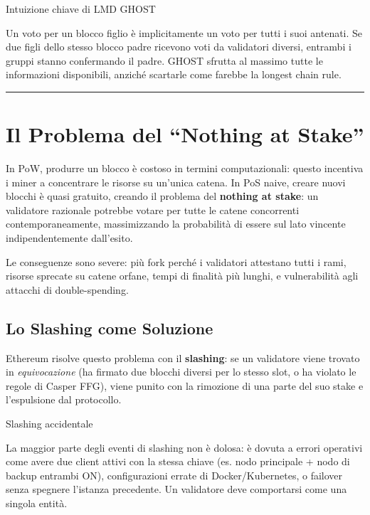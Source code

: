 \documentclass[
  italian,
  openany]{book}
\begin{document}
\begin{callouttip}{Intuizione chiave di LMD GHOST}

Un voto per un blocco figlio è implicitamente un voto per tutti i suoi
antenati. Se due figli dello stesso blocco padre ricevono voti da
validatori diversi, entrambi i gruppi stanno confermando il padre. GHOST
sfrutta al massimo tutte le informazioni disponibili, anziché scartarle
come farebbe la longest chain rule.

\end{callouttip}

\begin{center}\rule{0.5\linewidth}{0.5pt}\end{center}

\section{Il Problema del ``Nothing at
Stake''}\label{il-problema-del-nothing-at-stake}

In PoW, produrre un blocco è costoso in termini computazionali: questo
incentiva i miner a concentrare le risorse su un'unica catena. In PoS
naive, creare nuovi blocchi è quasi gratuito, creando il problema del
\textbf{nothing at stake}: un validatore razionale potrebbe votare per
tutte le catene concorrenti contemporaneamente, massimizzando la
probabilità di essere sul lato vincente indipendentemente dall'esito.

Le conseguenze sono severe: più fork perché i validatori attestano tutti
i rami, risorse sprecate su catene orfane, tempi di finalità più lunghi,
e vulnerabilità agli attacchi di double-spending.

\subsection{Lo Slashing come
Soluzione}\label{lo-slashing-come-soluzione}

Ethereum risolve questo problema con il \textbf{slashing}: se un
validatore viene trovato in \emph{equivocazione} (ha firmato due blocchi
diversi per lo stesso slot, o ha violato le regole di Casper FFG), viene
punito con la rimozione di una parte del suo stake e l'espulsione dal
protocollo.

\begin{calloutwarning}{Slashing accidentale}

La maggior parte degli eventi di slashing non è dolosa: è dovuta a
errori operativi come avere due client attivi con la stessa chiave (es.
nodo principale + nodo di backup entrambi ON), configurazioni errate di
Docker/Kubernetes, o failover senza spegnere l'istanza precedente. Un
validatore deve comportarsi come una singola entità.

\end{calloutwarning}
\end{document}
